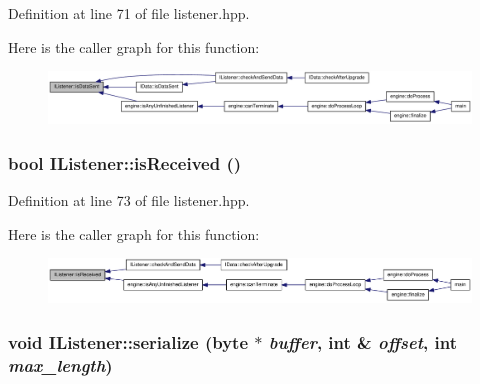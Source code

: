 Definition at line 71 of file listener.hpp.

Here is the caller graph for this function:\nopagebreak
\begin{figure}[H]
\begin{center}
\leavevmode
\includegraphics[width=420pt]{class_i_listener_af0cb8b56c305486c399dc60427864ef4_icgraph}
\end{center}
\end{figure}
\hypertarget{class_i_listener_aef5dea3b4b1ca6d3b14b3f5340514c0a}{
\subsubsection[{isReceived}]{\setlength{\rightskip}{0pt plus 5cm}bool IListener::isReceived ()}}
\label{class_i_listener_aef5dea3b4b1ca6d3b14b3f5340514c0a}


Definition at line 73 of file listener.hpp.

Here is the caller graph for this function:\nopagebreak
\begin{figure}[H]
\begin{center}
\leavevmode
\includegraphics[width=420pt]{class_i_listener_aef5dea3b4b1ca6d3b14b3f5340514c0a_icgraph}
\end{center}
\end{figure}
\hypertarget{class_i_listener_aab9d4cfe83a94b1ca4480e8d186ff112}{
\subsubsection[{serialize}]{\setlength{\rightskip}{0pt plus 5cm}void IListener::serialize ({\bf byte} $\ast$ {\em buffer}, \/  int \& {\em offset}, \/  int {\em max\_\-length})}}
\label{class_i_listener_aab9d4cfe83a94b1ca4480e8d186ff112}


